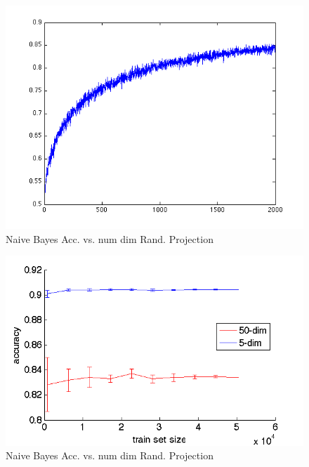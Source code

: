\documentclass[]{article}
\begin{document}
\begin{center}
\begin{figure}[h!]
\centering
\includegraphics[width=.5\textwidth]{../images/accuracy_vs_dim_randproj.png}
\caption{Naive Bayes Acc. vs. num dim Rand. Projection}
\label{fig:myfig}
\end{figure}
\end{center}


\begin{center}
\begin{figure}[h!]
\centering
\includegraphics[width=.5\textwidth]{../images/nb_5_vs_50.png}
\caption{Naive Bayes Acc. vs. num dim Rand. Projection}
\label{fig:myfig}
\end{figure}
\end{center}
\end{document}
